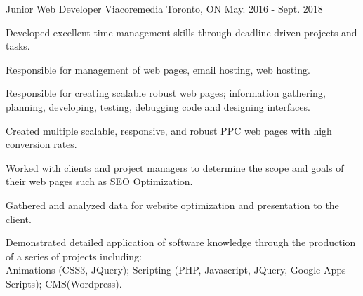 \begin{cventries}
\cventry
{Junior Web Developer} %
{Viacoremedia} %
{Toronto, ON} %
{May. 2016 - Sept. 2018} %
{ %
\begin{cvitems}
\item {Developed excellent time-management skills through deadline driven projects and tasks.}
\item {Responsible for management of web pages, email hosting, web hosting.}
\item {Responsible for creating scalable robust web pages; information gathering, planning, developing, testing, debugging code and designing interfaces.}
\item {Created multiple scalable, responsive, and robust PPC web pages with high conversion rates.}
\item {Worked with clients and project managers to determine the scope and goals of their web pages such as SEO Optimization.}
\item {Gathered and analyzed data for website optimization and presentation to the client.}
\item {Demonstrated detailed application of software knowledge through the production of a series of projects including: \\Animations (CSS3, JQuery); Scripting (PHP, Javascript, JQuery, Google Apps Scripts); CMS(Wordpress).}
\end{cvitems}
}


\end{cventries}